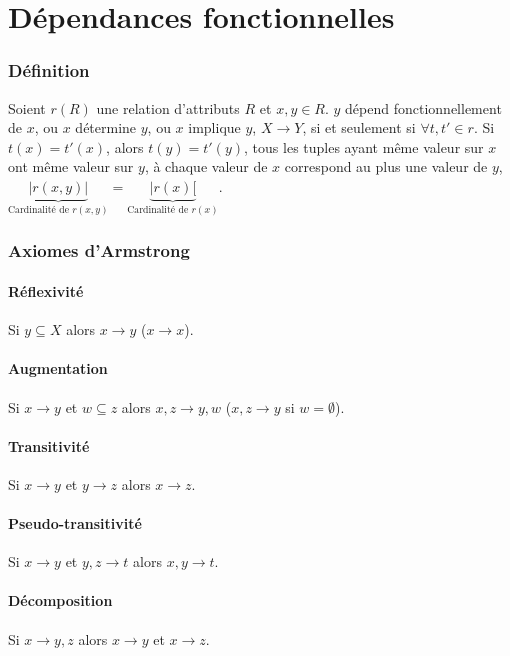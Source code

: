 \documentclass[10pt]{article}
\begin{document}
\newpage
\part{Dépendances fonctionnelles}
    \section{Définition}
        Soient $r(R)$ une relation d'attributs $R$ et $x,y\in R$. $y$ dépend fonctionnellement de $x$, ou $x$ détermine $y$, ou $x$ implique $y$, $X\rightarrow Y$, si et seulement si $\forall t,t'\in r$. Si $t(x)=t'(x)$, alors $t(y)=t'(y)$, tous les tuples ayant même valeur sur $x$ ont même valeur sur $y$, à chaque valeur de $x$ correspond au plus une valeur de $y$, $\underbrace{|r(x,y)|}_{\text{Cardinalité de }r(x,y)}=\underbrace{|r(x)[}_{\text{Cardinalité de }r(x)}$.

    \section{Axiomes d'Armstrong}
        \subsection{Réflexivité}
            Si $y\subseteq X$ alors $x\rightarrow y$ ($x\rightarrow x$).

        \subsection{Augmentation}
            Si $x\rightarrow y$ et $w\subseteq z$ alors $x,z\rightarrow y,w$ ($x,z\rightarrow y$ si $w=\emptyset$).

        \subsection{Transitivité}
            Si $x\rightarrow y$ et $y\rightarrow z$ alors $x\rightarrow z$.

        \subsection{Pseudo-transitivité}
            Si $x\rightarrow y$ et $y,z \rightarrow t$ alors $x,y\rightarrow t$.

        \subsection{Décomposition}
            Si $x\rightarrow y,z$ alors $x\rightarrow y$ et $x\rightarrow z$.
\end{document}
